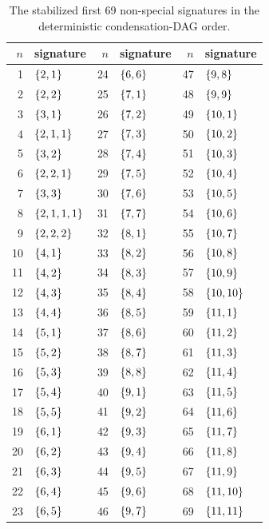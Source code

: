 \begingroup
\footnotesize
\begin{longtable}{@{}r l@{\qquad}r l@{\qquad}r l@{}}
  \caption{The stabilized first 69 non-special signatures in the
  deterministic condensation-DAG order.}
  \label{tab:first-69-signatures}\\
    \toprule
    \(n\) & signature & \(n\) & signature & \(n\) & signature \\
    \midrule
    1 & \(\left\{2,1\right\}\) & 24 & \(\left\{6,6\right\}\) & 47 & \(\left\{9,8\right\}\) \\
    2 & \(\left\{2,2\right\}\) & 25 & \(\left\{7,1\right\}\) & 48 & \(\left\{9,9\right\}\) \\
    3 & \(\left\{3,1\right\}\) & 26 & \(\left\{7,2\right\}\) & 49 & \(\left\{10,1\right\}\) \\
    4 & \(\left\{2,1,1\right\}\) & 27 & \(\left\{7,3\right\}\) & 50 & \(\left\{10,2\right\}\) \\
    5 & \(\left\{3,2\right\}\) & 28 & \(\left\{7,4\right\}\) & 51 & \(\left\{10,3\right\}\) \\
    6 & \(\left\{2,2,1\right\}\) & 29 & \(\left\{7,5\right\}\) & 52 & \(\left\{10,4\right\}\) \\
    7 & \(\left\{3,3\right\}\) & 30 & \(\left\{7,6\right\}\) & 53 & \(\left\{10,5\right\}\) \\
    8 & \(\left\{2,1,1,1\right\}\) & 31 & \(\left\{7,7\right\}\) & 54 & \(\left\{10,6\right\}\) \\
    9 & \(\left\{2,2,2\right\}\) & 32 & \(\left\{8,1\right\}\) & 55 & \(\left\{10,7\right\}\) \\
    10 & \(\left\{4,1\right\}\) & 33 & \(\left\{8,2\right\}\) & 56 & \(\left\{10,8\right\}\) \\
    11 & \(\left\{4,2\right\}\) & 34 & \(\left\{8,3\right\}\) & 57 & \(\left\{10,9\right\}\) \\
    12 & \(\left\{4,3\right\}\) & 35 & \(\left\{8,4\right\}\) & 58 & \(\left\{10,10\right\}\) \\
    13 & \(\left\{4,4\right\}\) & 36 & \(\left\{8,5\right\}\) & 59 & \(\left\{11,1\right\}\) \\
    14 & \(\left\{5,1\right\}\) & 37 & \(\left\{8,6\right\}\) & 60 & \(\left\{11,2\right\}\) \\
    15 & \(\left\{5,2\right\}\) & 38 & \(\left\{8,7\right\}\) & 61 & \(\left\{11,3\right\}\) \\
    16 & \(\left\{5,3\right\}\) & 39 & \(\left\{8,8\right\}\) & 62 & \(\left\{11,4\right\}\) \\
    17 & \(\left\{5,4\right\}\) & 40 & \(\left\{9,1\right\}\) & 63 & \(\left\{11,5\right\}\) \\
    18 & \(\left\{5,5\right\}\) & 41 & \(\left\{9,2\right\}\) & 64 & \(\left\{11,6\right\}\) \\
    19 & \(\left\{6,1\right\}\) & 42 & \(\left\{9,3\right\}\) & 65 & \(\left\{11,7\right\}\) \\
    20 & \(\left\{6,2\right\}\) & 43 & \(\left\{9,4\right\}\) & 66 & \(\left\{11,8\right\}\) \\
    21 & \(\left\{6,3\right\}\) & 44 & \(\left\{9,5\right\}\) & 67 & \(\left\{11,9\right\}\) \\
    22 & \(\left\{6,4\right\}\) & 45 & \(\left\{9,6\right\}\) & 68 & \(\left\{11,10\right\}\) \\
    23 & \(\left\{6,5\right\}\) & 46 & \(\left\{9,7\right\}\) & 69 & \(\left\{11,11\right\}\) \\
    \bottomrule
\end{longtable}
\endgroup

